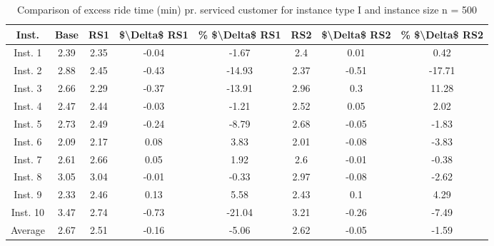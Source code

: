 \begin{table}[H]
\centering
\begin{tabular}{cccccccc}
  \hline
  \textbf{Inst.} & \textbf{Base} & \textbf{RS1} & \textbf{\$\textbackslash{}Delta\$  RS1} & \textbf{\% \$\textbackslash{}Delta\$  RS1} & \textbf{RS2} & \textbf{\$\textbackslash{}Delta\$  RS2} & \textbf{\% \$\textbackslash{}Delta\$  RS2} \\\hline
  Inst. 1 & 2.39 & 2.35 & -0.04 & -1.67 & 2.4 & 0.01 & 0.42 \\
  Inst. 2 & 2.88 & 2.45 & -0.43 & -14.93 & 2.37 & -0.51 & -17.71 \\
  Inst. 3 & 2.66 & 2.29 & -0.37 & -13.91 & 2.96 & 0.3 & 11.28 \\
  Inst. 4 & 2.47 & 2.44 & -0.03 & -1.21 & 2.52 & 0.05 & 2.02 \\
  Inst. 5 & 2.73 & 2.49 & -0.24 & -8.79 & 2.68 & -0.05 & -1.83 \\
  Inst. 6 & 2.09 & 2.17 & 0.08 & 3.83 & 2.01 & -0.08 & -3.83 \\
  Inst. 7 & 2.61 & 2.66 & 0.05 & 1.92 & 2.6 & -0.01 & -0.38 \\
  Inst. 8 & 3.05 & 3.04 & -0.01 & -0.33 & 2.97 & -0.08 & -2.62 \\
  Inst. 9 & 2.33 & 2.46 & 0.13 & 5.58 & 2.43 & 0.1 & 4.29 \\
  Inst. 10 & 3.47 & 2.74 & -0.73 & -21.04 & 3.21 & -0.26 & -7.49 \\
  Average & 2.67 & 2.51 & -0.16 & -5.06 & 2.62 & -0.05 & -1.59 \\\hline
\end{tabular}
\caption{Comparison of excess ride time (min) pr. serviced customer for instance type I and instance size n = 500}
\label{tab:wait:resrelocation-excess-ride-time-comparison_I_500}
\end{table}
